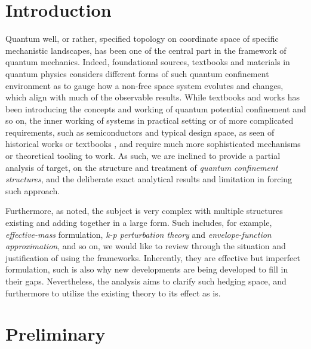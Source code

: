 \documentclass[%
 reprint,
 amsmath,amssymb,
 aps,
]{revtex4-2}
\begin{document}

\section{Introduction}

Quantum well, or rather, specified topology on coordinate space of specific mechanistic landscapes, has been one of the central part in the framework of quantum mechanics. Indeed, foundational sources, textbooks and materials in quantum physics considers different forms of such quantum confinement environment as to gauge how a non-free space system evolutes and changes, which align with much of the observable results. While textbooks and works \cite{griffiths2018,sakurai2017,landau1981} has been introducing the concepts and working of quantum potential confinement and so on, the inner working of systems in practical setting or of more complicated requirements, such as semiconductors and typical design space, as seen of historical works or textbooks \cite{kane1957,chang1980,kittel2005,bastard1988,davies1998,harrison2016,weisbuch1991,haugkoch2009,yu2010,barsan2016,esaki1974}, and require much more sophisticated mechanisms or theoretical tooling to work. As such, we are inclined to provide a partial analysis of target, on the structure and treatment of \textit{quantum confinement structures}, and the deliberate exact analytical results and limitation in forcing such approach. 

Furthermore, as noted, the subject is very complex with multiple structures existing and adding together in a large form. Such includes, for example, \textit{effective-mass} formulation, \textit{k-p perturbation theory} and \textit{envelope-function approximation}, and so on, we would like to review through the situation and justification of using the frameworks. Inherently, they are effective but imperfect formulation, such is also why new developments are being developed to fill in their gaps. Nevertheless, the analysis aims to clarify such hedging space, and furthermore to utilize the existing theory to its effect as is. 

\section{Preliminary}
\end{document}
